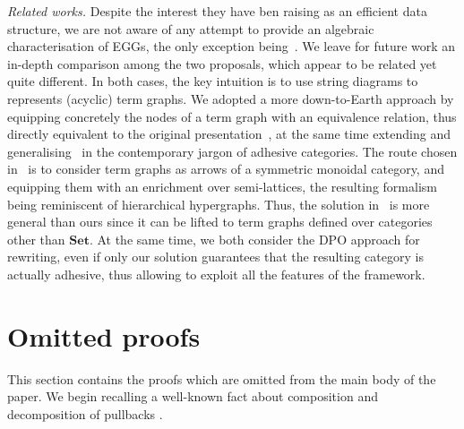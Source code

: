 \documentclass[a4paper,UKenglish,cleveref,pdftex,thm-restate,numberwithinsect]{lipics-v2021}
\newcommand{\Set}{\mathbf{Set}}
\begin{document}
\emph{Related works.}
Despite the interest they have ben raising as an efficient data structure, we are not aware of any attempt to provide an 
algebraic characterisation of EGGs, the only exception being~\cite{ghica}. We leave for future work an in-depth comparison 
among the two proposals, which appear to be related yet quite different.
%
In both cases, the key intuition is  to use string diagrams to represents (acyclic) term graphs. We adopted a
more down-to-Earth approach by equipping
concretely the nodes of a term graph with an equivalence relation, thus directly equivalent to the original presentation~\cite{DetlefsNS05},
at the same time extending and generalising~\cite{concur2006} in the contemporary jargon of adhesive categories.
The route chosen in~\cite{ghica} is to consider term graphs as arrows of a symmetric monoidal category,
and equipping them with an enrichment over semi-lattices, the resulting formalism being reminiscent of hierarchical hypergraphs.
Thus, the solution in~\cite{ghica}  is  more general than ours since it can be lifted to term graphs defined over categories other than
$\Set$.
%
At the same time, we both consider the DPO approach for rewriting, even if only our solution guarantees that the resulting category
is actually adhesive, thus allowing to exploit all the features of the framework.



\appendix

\section{Omitted proofs}

This section contains the proofs which are omitted from the main body of the paper. 
%
We begin recalling  a well-known fact about composition and decomposition of pullbacks \cite{mac2013categories}.
\end{document}
